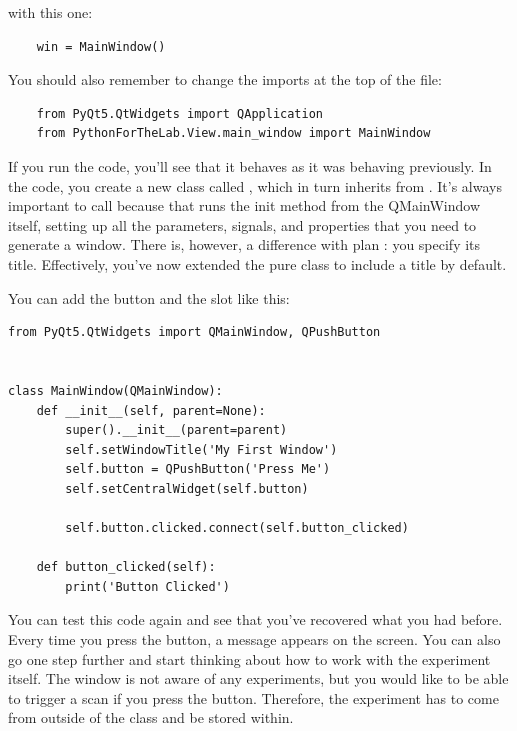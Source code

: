 with this one:

\begin{verbatim}
    win = MainWindow()
\end{verbatim}

You should also remember to change the imports at the top of the file:

\begin{verbatim}
    from PyQt5.QtWidgets import QApplication
    from PythonForTheLab.View.main_window import MainWindow
\end{verbatim}

If you run the code, you'll see that it behaves as it was behaving previously. In the code, you create a new class called , which in turn inherits from . It's always important to call  because that runs the init method from the QMainWindow itself, setting up all the parameters, signals, and properties that you need to generate a window. There is, however, a difference with plan : you specify its title. Effectively, you've now extended the pure  class to include a title by default.


You can add the button and the slot like this:

\begin{verbatim}
from PyQt5.QtWidgets import QMainWindow, QPushButton


class MainWindow(QMainWindow):
    def __init__(self, parent=None):
        super().__init__(parent=parent)
        self.setWindowTitle('My First Window')
        self.button = QPushButton('Press Me')
        self.setCentralWidget(self.button)

        self.button.clicked.connect(self.button_clicked)

    def button_clicked(self):
        print('Button Clicked')
\end{verbatim}

You can test this code again and see that you've recovered what you had before. Every time you press the button, a message appears on the screen. You can also go one step further and start thinking about how to work with the experiment itself. The window is not aware of any experiments, but you would like to be able to trigger a scan if you press the button. Therefore, the experiment has to come from outside of the class and be stored within.

